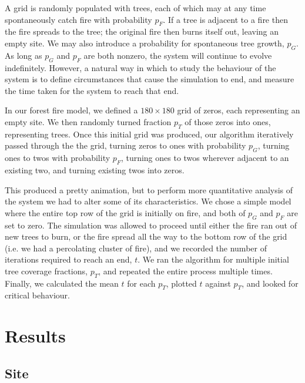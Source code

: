 \documentclass[%
 reprint,
 amsmath,amssymb,
 aps,
]{revtex4-2}
\begin{document}
A grid is randomly populated with trees, each of which may at any time spontaneously catch fire with probability $p_F$. If a tree is adjacent to a fire then the fire spreads to the tree; the original fire then burns itself out, leaving an empty site. We may also introduce a probability for spontaneous tree growth, $p_G$. As long as $p_G$ and $p_F$ are both nonzero, the system will continue to evolve indefinitely. However, a natural way in which to study the behaviour of the system is to define circumstances that cause the simulation to end, and measure the time taken for the system to reach that end\cite{stauffer_introduction_2003}.

In our forest fire model, we defined a $180\times180$ grid of zeros, each representing an empty site. We then randomly turned fraction $p_T$ of those zeros into ones, representing trees. Once this initial grid was produced, our algorithm iteratively passed through the the grid, turning zeros to ones with probability $p_G$, turning ones to twos with probability \(p_F\), turning ones to twos wherever adjacent to an existing two, and turning existing twos into zeros.

This produced a pretty animation, but to perform more quantitative analysis of the system we had to alter some of its characteristics. We chose a simple model where the entire top row of the grid is initially on fire, and both of $p_G$ and $p_F$ are set to zero. The simulation was allowed to proceed until either the fire ran out of new trees to burn, or the fire spread all the way to the bottom row of the grid (i.e. we had a percolating cluster of fire), and we recorded the number of iterations required to reach an end, $t$. We ran the algorithm for multiple initial tree coverage fractions, $p_T$, and repeated the entire process multiple times. Finally, we calculated the mean $t$ for each $p_T$, plotted $t$ against $p_T$, and looked for critical behaviour.
\section{Results}

\subsection{Site}
\end{document}

